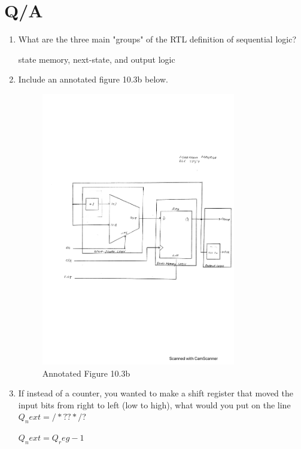 \documentclass[11pt]{article}
\begin{document}
 \section*{Q/A}
 \begin{enumerate}
 	\item What are the three main "groups" of the RTL definition of sequential logic?
 	
 	state memory, next-state, and output logic
 	
 	\item Include an annotated figure 10.3b below.
 	
 \begin{figure}[ht]\centering
 	\includegraphics[width=0.8\textwidth,trim=2cm 8cm 0cm 9cm,clip]{annotated_figure}
 	\caption{Annotated Figure 10.3b}
 	\label{fig:annotated_figure}			
 \end{figure}
 \clearpage
 	
 	\item If instead of a counter, you wanted to make a shift register that moved the input bits from right to left (low to high), what would you put on the line $Q_next = /*??*/$?
 	
 	$Q_next = Q_reg-1$
 	
 \end{enumerate}
\end{document}
